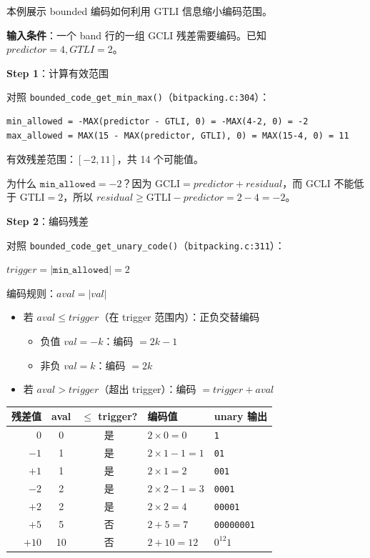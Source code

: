 \begin{examplebox}[title={例 2c：Bounded 编码示例}]

本例展示 bounded 编码如何利用 GTLI 信息缩小编码范围。

\medskip
\textbf{输入条件}：一个 band 行的一组 GCLI 残差需要编码。已知 $\mathit{predictor} = 4, \mathit{GTLI} = 2$。

\medskip
\textbf{Step 1}：计算有效范围

对照 \texttt{bounded\_code\_get\_min\_max()}（\texttt{bitpacking.c:304}）：

\begin{lstlisting}[numbers=none]
min_allowed = -MAX(predictor - GTLI, 0) = -MAX(4-2, 0) = -2
max_allowed = MAX(15 - MAX(predictor, GTLI), 0) = MAX(15-4, 0) = 11
\end{lstlisting}

有效残差范围：$[-2, 11]$，共 14 个可能值。

为什么 $\texttt{min\_allowed} = -2$？因为 $\mathrm{GCLI} = \mathit{predictor} + \mathit{residual}$，而 GCLI 不能低于 $\mathrm{GTLI} = 2$，所以 $\mathit{residual} \geq \mathrm{GTLI} - \mathit{predictor} = 2 - 4 = -2$。

\textbf{Step 2}：编码残差

对照 \texttt{bounded\_code\_get\_unary\_code()}（\texttt{bitpacking.c:311}）：

$\mathit{trigger} = |\texttt{min\_allowed}| = 2$

编码规则：$\mathit{aval} = |\mathit{val}|$
\begin{itemize}
  \item 若 $\mathit{aval} \leq \mathit{trigger}$（在 trigger 范围内）：正负交替编码
    \begin{itemize}
      \item 负值 $\mathit{val} = -k$：编码 $= 2k - 1$
      \item 非负 $\mathit{val} = k$：编码 $= 2k$
    \end{itemize}
  \item 若 $\mathit{aval} > \mathit{trigger}$（超出 trigger）：编码 $= \mathit{trigger} + \mathit{aval}$
\end{itemize}

\begin{table}[H]
\centering
\begin{tabular}{@{}rccll@{}}
\toprule
残差值 & aval & $\leq$ trigger? & 编码值 & unary 输出 \\
\midrule
0 & 0 & 是 & $2 \times 0 = 0$ & \texttt{1} \\
$-1$ & 1 & 是 & $2 \times 1 - 1 = 1$ & \texttt{01} \\
$+1$ & 1 & 是 & $2 \times 1 = 2$ & \texttt{001} \\
$-2$ & 2 & 是 & $2 \times 2 - 1 = 3$ & \texttt{0001} \\
$+2$ & 2 & 是 & $2 \times 2 = 4$ & \texttt{00001} \\
$+5$ & 5 & 否 & $2 + 5 = 7$ & \texttt{00000001} \\
$+10$ & 10 & 否 & $2 + 10 = 12$ & $0^{12}1$ \\
\bottomrule
\end{tabular}
\end{table}


\end{examplebox}
